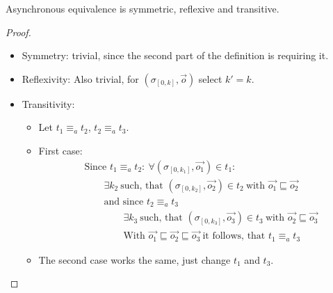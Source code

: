\begin{lemma}[name=Asynchronous equivalence is an equivalence Relationship]\label{lemma:async_equivalence_is_equivalence_relationship}
  Asynchronous equivalence is symmetric, reflexive and transitive.
\end{lemma}
\begin{proof}$ $\newline
  \begin{itemize}
    \item Symmetry: trivial, since the second part of the definition is requiring it.
    \item Reflexivity: Also trivial, for \((\sigma_{[0,k]}, \vec{o})\) select \(k' = k\).
    \item Transitivity:
      \begin{itemize}
        \item Let \(t_1 \equiv_a t_2\), \(t_2 \equiv_a t_3\).
        \item First case:
          \begin{align*}
            &\text{Since } t_1 \equiv_a t_2:\ \forall (\sigma_{[0,k_1]}, \vec{o_1}) \in t_1: \\
            &\hspace{2em} \exists k_2\ \text{such, that } (\sigma_{[0,k_2]}, \vec{o_2}) \in t_2\ \text{with } \vec{o_1} \sqsubseteq \vec{o_2} \\
            &\hspace{2em} \text{and since } t_2 \equiv_a t_3 \\
            &\hspace{4em} \exists k_3\ \text{such, that } (\sigma_{[0,k_3]}, \vec{o_3}) \in t_3\ \text{with } \vec{o_2} \sqsubseteq \vec{o_3}\\
            &\hspace{4em} \text{With } \vec{o_1} \sqsubseteq \vec{o_2} \sqsubseteq \vec{o_3}\ \text{it follows, that } t_1 \equiv_a t_3
          \end{align*}
        \item The second case works the same, just change \(t_1\) and \(t_3\).
      \end{itemize}
  \end{itemize}
\end{proof}

